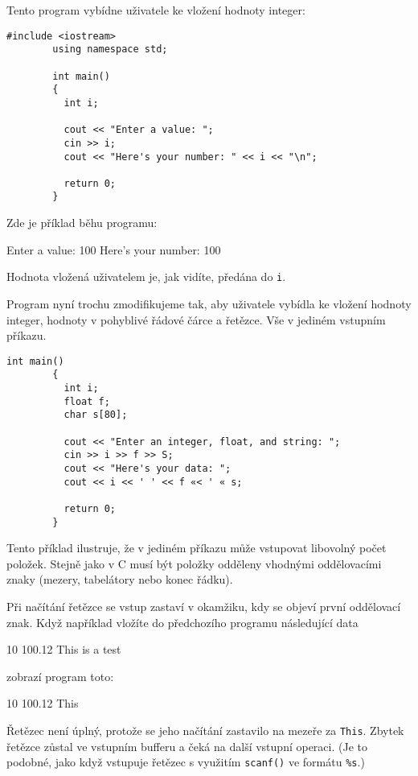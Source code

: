 \begin{mdframed}[style=mdexam]
  \begin{example}\label{cpp:exam004}
   Tento program vybídne uživatele ke vložení hodnoty integer:
      \begin{lstlisting}[style=luaCPPStyle]
        #include <iostream> 
        using namespace std;
        
        int main()
        {
          int i;

          cout << "Enter a value: "; 
          cin >> i;
          cout << "Here's your number: " << i << "\n";

          return 0;
        }
      \end{lstlisting}
    Zde je příklad běhu programu:
    \begin{mdframed}[style=mdmsdos]
      Enter a value: 100 \newline
      Here's your number: 100
    \end{mdframed}  
    Hodnota vložená uživatelem je, jak vidíte, předána do \texttt{i}. 

    Program nyní trochu zmodifikujeme tak, aby uživatele vybídla ke vložení hodnoty integer,
    hodnoty v pohyblivé řádové čárce a řetězce. Vše v jediném vstupním příkazu.
      \begin{lstlisting}[style=luaCPPStyle]    
        int main()
        {
          int i; 
          float f; 
          char s[80];

          cout << "Enter an integer, float, and string: "; 
          cin >> i >> f >> S; 
          cout << "Here's your data: "; 
          cout << i << ' ' << f «< ' « s;

          return 0;
        }
      \end{lstlisting}
    Tento příklad ilustruje, že v jediném příkazu může vstupovat libovolný počet položek. Stejně
    jako v C musí být položky odděleny vhodnými oddělovacími znaky (mezery, tabelátory nebo konec
    řádku).  

    Při načítání řetězce se vstup zastaví v okamžiku, kdy se objeví první oddělovací znak. Když
    například vložíte do předchozího programu následující data 
    \begin{mdframed}[style=mdmsdos]
      10 100.12 This is a test
    \end{mdframed}  
    zobrazí program toto:
    \begin{mdframed}[style=mdmsdos]
      10 100.12 This
    \end{mdframed}  
    Řetězec není úplný, protože se jeho načítání zastavilo na mezeře za \texttt{This}. Zbytek
    řetězce zůstal ve vstupním bufferu a čeká na další vstupní operaci. (Je to podobné, jako když
    vstupuje řetězec s využitím \lstinline[style=luaCPPText]!scanf()! ve formátu \texttt{\%s}.)   
  \end{example}
\end{mdframed}
